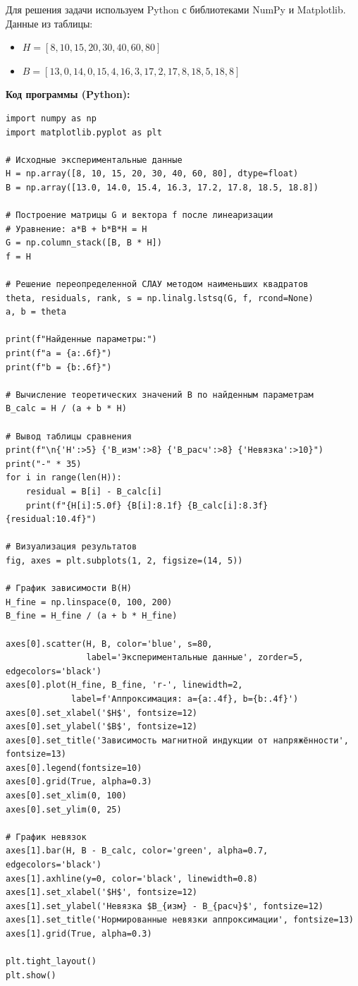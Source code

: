 \documentclass{article}
\begin{document}
Для решения задачи используем Python с библиотеками NumPy и Matplotlib. Данные из таблицы:
\begin{itemize}
\item $H = [8, 10, 15, 20, 30, 40, 60, 80]$
\item $B = [13{,}0, 14{,}0, 15{,}4, 16{,}3, 17{,}2, 17{,}8, 18{,}5, 18{,}8]$
\end{itemize}

\textbf{Код программы (Python):}

\begin{verbatim}
import numpy as np
import matplotlib.pyplot as plt

# Исходные экспериментальные данные
H = np.array([8, 10, 15, 20, 30, 40, 60, 80], dtype=float)
B = np.array([13.0, 14.0, 15.4, 16.3, 17.2, 17.8, 18.5, 18.8])

# Построение матрицы G и вектора f после линеаризации
# Уравнение: a*B + b*B*H = H
G = np.column_stack([B, B * H])
f = H

# Решение переопределенной СЛАУ методом наименьших квадратов
theta, residuals, rank, s = np.linalg.lstsq(G, f, rcond=None)
a, b = theta

print(f"Найденные параметры:")
print(f"a = {a:.6f}")
print(f"b = {b:.6f}")

# Вычисление теоретических значений B по найденным параметрам
B_calc = H / (a + b * H)

# Вывод таблицы сравнения
print(f"\n{'H':>5} {'B_изм':>8} {'B_расч':>8} {'Невязка':>10}")
print("-" * 35)
for i in range(len(H)):
    residual = B[i] - B_calc[i]
    print(f"{H[i]:5.0f} {B[i]:8.1f} {B_calc[i]:8.3f} {residual:10.4f}")

# Визуализация результатов
fig, axes = plt.subplots(1, 2, figsize=(14, 5))

# График зависимости B(H)
H_fine = np.linspace(0, 100, 200)
B_fine = H_fine / (a + b * H_fine)

axes[0].scatter(H, B, color='blue', s=80, 
                label='Экспериментальные данные', zorder=5, edgecolors='black')
axes[0].plot(H_fine, B_fine, 'r-', linewidth=2, 
             label=f'Аппроксимация: a={a:.4f}, b={b:.4f}')
axes[0].set_xlabel('$H$', fontsize=12)
axes[0].set_ylabel('$B$', fontsize=12)
axes[0].set_title('Зависимость магнитной индукции от напряжённости', fontsize=13)
axes[0].legend(fontsize=10)
axes[0].grid(True, alpha=0.3)
axes[0].set_xlim(0, 100)
axes[0].set_ylim(0, 25)

# График невязок
axes[1].bar(H, B - B_calc, color='green', alpha=0.7, edgecolors='black')
axes[1].axhline(y=0, color='black', linewidth=0.8)
axes[1].set_xlabel('$H$', fontsize=12)
axes[1].set_ylabel('Невязка $B_{изм} - B_{расч}$', fontsize=12)
axes[1].set_title('Нормированные невязки аппроксимации', fontsize=13)
axes[1].grid(True, alpha=0.3)

plt.tight_layout()
plt.show()
\end{verbatim}
\end{document}
